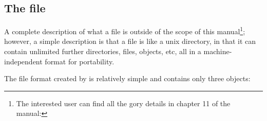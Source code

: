 \subsection{The \ROOT file}
A complete description of what a \ROOT file is outside of the scope of
this manual\footnote{The interested user can find all the gory details
  in chapter 11 of the \ROOT manual:
  };
however, a simple description is that a \ROOT file is like a unix
directory, in that it can contain unlimited further directories,
files, objects, etc, all in a machine-independent format for
portability.

\lstset{
  language=C++, 
  basicstyle=\footnotesize, 
  numbers=left,
  numberstyle=\footnotesize,
  numbersep=0pt
}

The \ROOT file format created by \ADAQ is relatively
simple and  contains only three objects:
